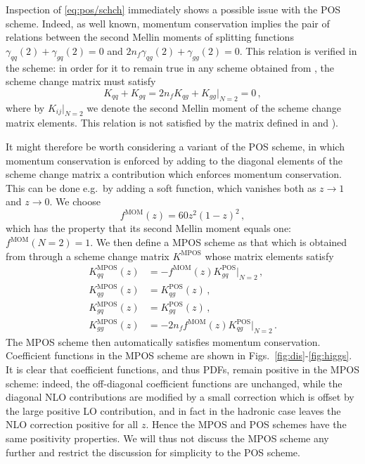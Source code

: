 Inspection of \cref{eq:pos/schch} immediately shows a possible issue
with the POS scheme. Indeed, as well known, momentum conservation
implies the pair of relations between the second Mellin moments of splitting
functions $\gamma_{qq}(2)+\gamma_{gq}(2)=0$ and
 $2n_f\gamma_{qg}(2)+\gamma_{gg}(2)=0$. This relation is verified in the
\msbar{} scheme:  in order for it to remain true  in any scheme obtained
from \msbar{}, the scheme change matrix must satisfy
\begin{equation}\label{eq:pos/momcons}
  K_{qq}+K_{gq}=2n_fK_{qg}+K_{gg}\Big|_{N=2}=0 \,,
\end{equation}
where by $K_{ij}\Big|_{N=2}$ we denote the second Mellin moment of the
scheme change matrix elements. This relation is not satisfied by the matrix
defined in  and
).

It might therefore be worth considering a variant of the POS scheme,
in which momentum conservation is enforced by adding to the diagonal
elements of the scheme change matrix a contribution which enforces
momentum conservation. This can be done e.g.\ by adding a soft
function, which vanishes both as $z\to1$ and $z \to0$. We choose
\begin{equation}\label{eq:pos/fmom}
  f^{\textrm{MOM}}(z)= 60 z^2(1-z)^2\,,
\end{equation}
which has the property that its second Mellin moment equals one:
$f^{\textrm{MOM}}(N=2)=1$. We then define a MPOS scheme as that which is obtained
from \msbar{} through a scheme change matrix $K^{\textrm{MPOS}}$ whose
matrix elements satisfy
\begin{align}
  \label{eq:pos/mposqq}
  K^{\textrm{MPOS}}_{qq}(z)&= - f^{\textrm{MOM}}(z) K^{\textrm{POS}}_{gq}\Big|_{N=2} \,,\\
  \label{eq:pos/mposqg}
  K^{\textrm{MPOS}}_{qg}(z)&= K^{\textrm{POS}}_{qg}(z) \,,\\
  \label{eq:pos/mposgq}
  K^{\textrm{MPOS}}_{gq}(z)&= K^{\textrm{POS}}_{gq}(z) \,,\\
  \label{eq:pos/mposgg}
  K^{\textrm{MPOS}}_{gg}(z)&= -2n_f f^{\textrm{MOM}}(z) K^{\textrm{POS}}_{qg}\Big|_{N=2} \,.
\end{align}
The MPOS scheme then automatically satisfies momentum
conservation. Coefficient functions in the MPOS scheme are shown in
Figs.~\ref{fig:dis}-\ref{fig:higgs}. It is clear that coefficient
functions, and thus PDFs, remain
positive in the MPOS scheme: indeed, the off-diagonal coefficient
functions are unchanged, while the diagonal NLO contributions are
modified by a small correction which is offset by the large positive
LO contribution, and in fact in the hadronic case leaves the NLO
correction positive for all $z$. Hence the MPOS and POS schemes have the same
positivity properties. We will thus not discuss the MPOS scheme
any further and restrict the discussion for simplicity to the POS
scheme.

